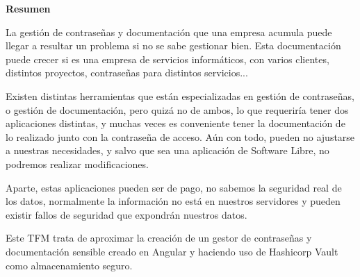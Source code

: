 \documentclass{\ClassPath/viu-tfm-template}
\begin{document}
\graphicspath{{../VIU_TFM_LaTeX_template/}}

\coverpage




\vspace*{\fill}
\begin{center}
    \textbf{Resumen}
\end{center}

La gestión de contraseñas y documentación que una empresa acumula puede llegar a resultar un problema si no se sabe gestionar bien. Esta documentación puede crecer si es una empresa de servicios informáticos, con varios clientes, distintos proyectos, contraseñas para distintos servicios...

Existen distintas herramientas que están especializadas en gestión de contraseñas, o gestión de documentación, pero quizá no de ambos, lo que requeriría tener dos aplicaciones distintas, y muchas veces es conveniente tener la documentación de lo realizado junto con la contraseña de acceso. Aún con todo, pueden no ajustarse a nuestras necesidades, y salvo que sea una aplicación de Software Libre, no podremos realizar modificaciones.

Aparte, estas aplicaciones pueden ser de pago, no sabemos la seguridad real de los datos, normalmente la información no está en nuestros servidores y pueden existir fallos de seguridad que expondrán nuestros datos.

Este TFM trata de aproximar la creación de un gestor de contraseñas y documentación sensible creado en Angular y haciendo uso de Hashicorp Vault como almacenamiento seguro.


\vspace*{\fill}
\vspace*{\fill}
\vspace*{\fill}

\pagebreak

\end{document}
